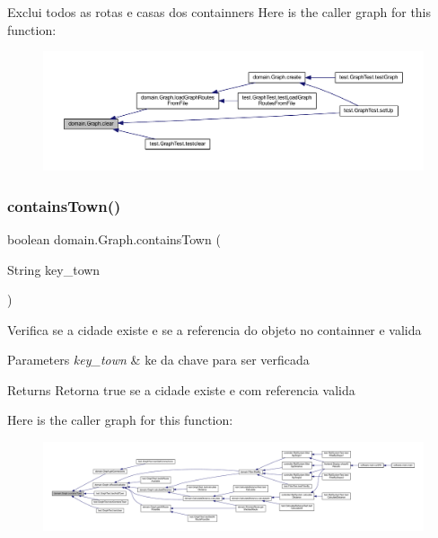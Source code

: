 Exclui todos as rotas e casas dos containners Here is the caller graph for this function\+:\nopagebreak
\begin{figure}[H]
\begin{center}
\leavevmode
\includegraphics[width=350pt]{classdomain_1_1_graph_ab310780b6719b7b94e8eea0a0603f6c1_icgraph}
\end{center}
\end{figure}
\mbox{\label{classdomain_1_1_graph_aa8ae0912dcbd41c932ab29815e85af36}} 
\subsubsection{\texorpdfstring{contains\+Town()}{containsTown()}}
{\footnotesize\ttfamily boolean domain.\+Graph.\+contains\+Town (\begin{DoxyParamCaption}\item[{String}]{key\+\_\+town }\end{DoxyParamCaption})}

Verifica se a cidade existe e se a referencia do objeto no containner e valida


\begin{DoxyParams}{Parameters}
{\em key\+\_\+town} & ke da chave para ser verficada \\
\hline
\end{DoxyParams}
\begin{DoxyReturn}{Returns}
Retorna true se a cidade existe e com referencia valida 
\end{DoxyReturn}
Here is the caller graph for this function\+:\nopagebreak
\begin{figure}[H]
\begin{center}
\leavevmode
\includegraphics[width=350pt]{classdomain_1_1_graph_aa8ae0912dcbd41c932ab29815e85af36_icgraph}
\end{center}
\end{figure}
\mbox{\label{classdomain_1_1_graph_a57ce4efd344c059a565f4bb104fdee64}} 
